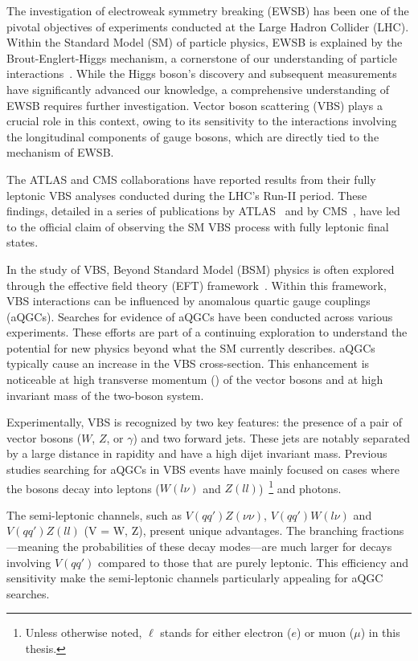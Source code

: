 
The investigation of electroweak symmetry breaking (EWSB) has been one of the pivotal objectives of experiments conducted at the Large Hadron Collider (LHC). 
Within the Standard Model (SM) of particle physics, EWSB is explained by the Brout-Englert-Higgs mechanism, a cornerstone of our understanding of particle interactions~\cite{Englert:1964et,Higgs:1964pj,Guralnik:1964eu}. 
While the Higgs boson's discovery and subsequent measurements have significantly advanced our knowledge, a comprehensive understanding of EWSB requires further investigation.
Vector boson scattering (VBS) plays a crucial role in this context, owing to its sensitivity to the interactions involving the longitudinal components of gauge bosons, which are directly tied to the mechanism of EWSB.

The ATLAS and CMS collaborations have reported results from their fully leptonic VBS analyses conducted during the LHC's Run-II period. These findings, detailed in a series of publications by ATLAS~\cite{STDM-2017-19, STDM-2017-06, STDM-2017-23} and by CMS~\cite{2021135992, 2022137438}, have led to the official claim of observing the SM VBS process with fully leptonic final states.

In the study of VBS, Beyond Standard Model (BSM) physics is often explored through the effective field theory (EFT) framework~\cite{Longhitano:1980tm}. Within this framework, VBS interactions can be influenced by anomalous quartic gauge couplings (aQGCs). Searches for evidence of aQGCs have been conducted across various experiments. These efforts are part of a continuing exploration to understand the potential for new physics beyond what the SM currently describes.
aQGCs typically cause an increase in the VBS cross-section. This enhancement is noticeable at high transverse momentum (\pt) of the vector bosons and at high invariant mass of the two-boson system.

Experimentally, VBS is recognized by two key features: the presence of a pair of vector bosons ($W$, $Z$, or $\gamma$) and two forward jets. These jets are notably separated by a large distance in rapidity and have a high dijet invariant mass. Previous studies searching for aQGCs in VBS events have mainly focused on cases where the bosons decay into leptons ($W(l\nu)$ and $Z(ll)$)~\footnote{Unless otherwise noted, $\ell$ stands for either electron ($e$) or muon ($\mu$) in this thesis.} and photons.

The semi-leptonic channels, such as $V(qq')Z(\nu\nu)$, $V(qq')W(l\nu)$ and $V(qq')Z(ll)$ (V = W, Z), present unique advantages. 
The branching fractions—meaning the probabilities of these decay modes—are much larger for decays involving $V(qq')$ compared to those that are purely leptonic. 
This efficiency and sensitivity make the semi-leptonic channels particularly appealing for aQGC searches.

